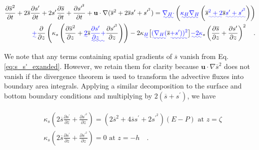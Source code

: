 \documentclass[draft]{agujournal2019}
\providecommand{\DIFadd}[1]{{\protect\color{blue}\uwave{#1}}} %
\providecommand{\DIFaddbegin}{} %
\providecommand{\DIFaddend}{} %
\providecommand{\DIFdelbegin}{} %
\providecommand{\DIFdelend}{} %
\begin{document}
\begin{linenomath*}
\begin{equation} \label{eq:s_s'_exanded}
    \begin{split}
        \frac{\partial \overline{s}^2}{\partial t} + 2\overline{s} \frac{\partial s^\prime}{\partial t} +2s^\prime \frac{\partial \overline{s}}{\partial t} + \frac{\partial s^{\prime^2}}{\partial t}+
        \textbf{u} \cdot \nabla(\overline{s}^2+2 \overline{s} s^\prime+s^{\prime^2}) = \DIFaddbegin \DIFadd{\nabla_H \cdot }\left(\DIFadd{\kappa_H \nabla_H }\left(\overline{s}\DIFadd{^2+2}\overline{s}\DIFadd{s^{\prime}+s^{\prime^2} }\right) \right) \DIFaddend \\
        \DIFaddbegin \DIFadd{+ }\DIFaddend \frac{\partial}{\partial z} \DIFdelbegin %
\DIFdelend \DIFaddbegin \left(\DIFaddend \kappa_s \DIFdelbegin %
\DIFdelend \DIFaddbegin \left(\DIFaddend \frac{\partial \overline{s}^2}{\partial z} + \DIFaddbegin \DIFadd{2}\overline{s} \DIFadd{\frac{\partial s^\prime}{\partial z} + }\DIFaddend \frac{\partial s^{\prime^2}}{\partial z} \DIFdelbegin %
\DIFdelend \DIFaddbegin \right) \right) \DIFaddend -2\kappa\DIFaddbegin \DIFadd{_H }\big[\DIFadd{(\nabla_H (}\overline{s}\DIFadd{+s^\prime))^2 }\big]\DIFadd{-2 \kappa}\DIFaddend _s \DIFdelbegin %
\DIFdelend \DIFaddbegin \left(\DIFaddend \frac{\partial \overline{s}}{\partial z} + \frac{\partial s^\prime}{\partial z} \DIFdelbegin %
\DIFdelend \DIFaddbegin \right)\DIFaddend ^{2} \quad .
    \end{split}
\end{equation}
\end{linenomath*}
We note that any terms containing spatial gradients of $\overline{s}$ vanish from Eq. \ref{eq:s_s'_exanded}. However, we retain them for clarity because $\mathbf{u} \cdot \nabla \overline{s}^2$ does not vanish if the divergence theorem is used to transform the advective fluxes into boundary area integrals. Applying a similar decomposition to the surface and bottom boundary conditions and multiplying by $2(\overline{s}+s^\prime)$,  we have
\begin{linenomath*}
\begin{align} \label{eq:salt_bcs_sprime_expanded}
\begin{split}
    &  \kappa_s \DIFdelbegin %
\DIFdelend \DIFaddbegin \left(\DIFaddend 2\overline{s} \frac{\partial s^\prime}{\partial z}+\frac{\partial s^{\prime^2}}{\partial z}\DIFdelbegin %
\DIFdelend \DIFaddbegin \right) \DIFaddend = (2\overline{s}^2+4 \overline{s} s^\prime+2s^{\prime^2})(E-P) \,\, \textrm{at} \,\, z = \zeta \\
    &  \kappa_s \DIFdelbegin %
\DIFdelend \DIFaddbegin \left(\DIFaddend 2\overline{s} \frac{\partial s^\prime}{\partial z} +\frac{\partial s^{\prime^2}}{\partial z}\DIFdelbegin %
\DIFdelend \DIFaddbegin \right) \DIFaddend = 0 \,\, \textrm{at} \,\, z = -h \quad . \\
\end{split}
\end{align}
\end{linenomath*}
\end{document}
